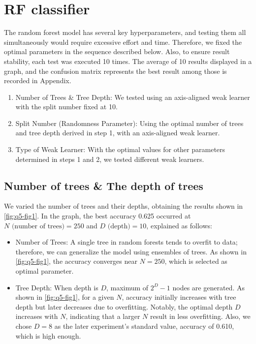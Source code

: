 \section{RF classifier}
\label{sec:intro}

The random forest model has several key hyperparameters, and testing them all simultaneously would require excessive effort and time. Therefore, we fixed the optimal parameters in the sequence described below. Also, to ensure result stability, each test was executed 10 times. The average of 10 results displayed in a graph, and the confusion matrix represents the best result among those is recorded in Appendix.
\begin{enumerate}
	\item Number of Trees \& Tree Depth: We tested using an axis-aligned weak learner with the split number fixed at 10.
	\item Split Number (Randomness Parameter): Using the optimal number of trees and tree depth derived in step 1, with an axis-aligned weak learner.
	\item Type of Weak Learner: With the optimal values for other parameters determined in steps 1 and 2, we tested different weak learners.
\end{enumerate}

\subsection{Number of trees \& The depth of trees}
We varied the number of trees and their depths, obtaining the results shown in \cref{fig:q5-fig1}. In the graph, the best accuracy 0.625 occurred at $N \text{ (number of trees)} = 250$ and $D\text{ (depth)}=10$, explained as follows:
\begin{itemize}
	\item Number of Trees: A single tree in random forests tends to overfit to data; therefore, we can generalize the model using ensembles of trees. As shown in \cref{fig:q5-fig1}, the accuracy converges near $N=250$, which is selected as optimal parameter.
	\item Tree Depth: When depth is $D$, maximum of $2^D-1$ nodes are generated. As shown in \cref{fig:q5-fig1}, for a given $N$, accuracy initially increases with tree depth but later decreases due to overfitting. Notably, the optimal depth $D$ increases with $N$, indicating that a larger $N$ result in less overfitting. Also, we chose $D=8$ as the later experiment's standard value, accuracy of 0.610, which is high enough.
\end{itemize}

